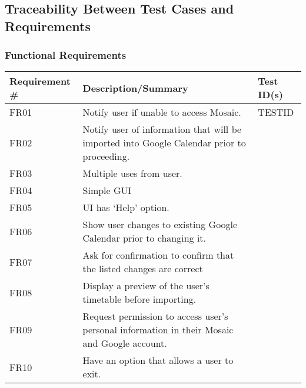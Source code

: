 \documentclass[12pt, titlepage]{article}
\begin{document}
\subsection{Traceability Between Test Cases and Requirements}

\subsubsection{Functional Requirements}
\begin{tabularx}{\textwidth}{p{3cm}X}
\toprule
\textbf{Requirement #} & \textbf{Description/Summary} &
\textbf{Test ID(s)}\\
\midrule
FR01 & Notify user if unable to access Mosaic. & TESTID\\
FR02 & Notify user of information that will be imported into Google Calendar prior to proceeding. & \\
FR03 & Multiple uses from user. &\\
FR04 & Simple GUI & \\
FR05 & UI has ‘Help’ option. & \\
FR06 & Show user changes to existing Google Calendar prior to changing it. & \\
FR07 & Ask for conﬁrmation to conﬁrm that the listed changes are correct & \\
FR08 & Display a preview of the user’s timetable before importing. & \\
FR09 & Request permission to access user’s personal information in their Mosaic and Google account. & \\
FR10 & Have an option that allows a user to exit. & \\
\bottomrule
\end{tabularx}
\end{document}
